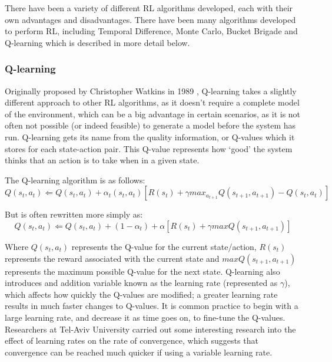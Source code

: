 \documentclass[a4paper,oneside]{report}
\begin{document}
There have been a variety of different RL algorithms developed, each with their own advantages and disadvantages. There have been many algorithms developed to perform RL, including Temporal Difference, Monte Carlo, Bucket Brigade and Q-learning which is described in more detail below.

\subsubsection{Q-learning}

Originally proposed by Christopher Watkins in 1989 \cite{Watkins:1989mi}, Q-learning takes a slightly different approach to other RL algorithms, as it doesn't require a complete model of the environment, which can be a big advantage in certain scenarios, as it is not often not possible (or indeed feasible) to generate a model before the system has run. Q-learning gets its name from the quality information, or Q-values which it stores for each state-action pair. This Q-value represents how `good' the system thinks that an action is to take when in a given state.

\noindent The Q-learning algorithm is as follows:
\begin{equation*}
	Q(s_t,a_t) \Leftarrow Q(s_t, a_t) + \alpha_t(s_t, a_t)[R(s_t) + \gamma max_{a_{t+1}} Q(s_{t+1}, a_{t+1}) - Q(s_t, a_t)]
\end{equation*}

\noindent But is often rewritten more simply as:
\begin{equation*}
	Q(s_t,a_t) \Leftarrow Q(s_t, a_t) + (1 -\alpha_t) + \alpha[R(s_t) + \gamma max Q(s_{t+1}, a_{t+1})]
\end{equation*}

Where $Q(s_t, a_t)$ represents the Q-value for the current state/action, $R(s_t)$ represents the reward associated with the current state and $max Q(s_{t+1}, a_{t+1})$ represents the maximum possible Q-value for the next state. Q-learning also introduces and addition variable known as the learning rate (represented as $\gamma$), which affects how quickly the Q-values are modified; a greater learning rate results in much faster changes to Q-values. It is common practice to begin with a large learning rate, and decrease it as time goes on, to fine-tune the Q-values. Researchers at Tel-Aviv University carried out some interesting research into the effect of learning rates on the rate of convergence, which suggests that convergence can be reached much quicker if using a variable learning rate.
\end{document}
